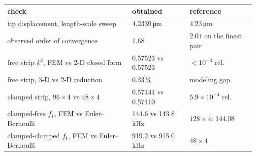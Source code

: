 \begin{tabular}{@{}l l l@{}}
\toprule
check & obtained & reference \\
\midrule
tip displacement, length-scale sweep & 4.2339\,\si{\micro\meter} & 4.23\,\si{\micro\meter} \\
observed order of convergence & 1.68 & $2.01$ on the finest pair \\
free strip $k^2$, FEM vs 2-D closed form & 0.57523 vs 0.57523 & $<10^{-3}$ rel. \\
free strip, 3-D vs 2-D reduction & 0.33\,\% & modeling gap \\
clamped strip, $96\times4$ vs $48\times4$ & 0.57444 vs 0.57410 & $5.9\times10^{-4}$ rel. \\
clamped-free $f_1$, FEM vs Euler--Bernoulli & 144.6 vs 143.8\,\si{\kilo\hertz} & $128\times4$: 144.08 \\
clamped-clamped $f_1$, FEM vs Euler--Bernoulli & 919.2 vs 915.0\,\si{\kilo\hertz} & $48\times4$ \\
\bottomrule
\end{tabular}
